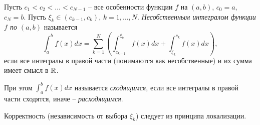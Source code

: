 \begin{definition}
    Пусть $c_{1} < c_{2} < \ldots < c_{N-1}$ -- все особенности функции $f$ на $(a, b)$, $c_{0} = a$, $c_{N} = b$. Пусть $\xi_{k} \in (c_{k-1}, c_{k})$, $k = 1, \ldots , N$. \textit{Несобственным интегралом функции $f$ по $(a, b)$} называется
    \[\int_{a}^{b}f(x)dx = \sum_{k = 1}^{N}\left( \int_{c_{k-1}}^{\xi_{k}}f(x)dx + \int_{\xi_{k}}^{c_{k}}f(x)dx \right),\]
    если все интегралы в правой части (понимаются как несобственные) и их сумма имеет смысл в $\mathbb{R}$.
    
    При этом $\int_{a}^{b}f(x)dx$ называется \textit{сходящимся}, если все интегралы в правой части сходятся, иначе -- \textit{расходящимся}.
\end{definition}

\begin{note}
    Корректность (независимость от выбора $\xi_{k}$) следует из принципа локализации.
\end{note}